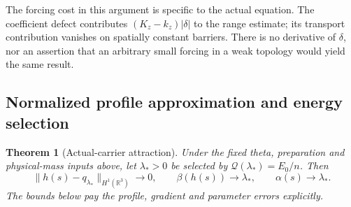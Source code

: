 \documentclass[11pt]{article}
\numberwithin{equation}{section}
\newtheorem{theorem}{Theorem}[section]
\newcommand{\R}{\mathbb R}
\begin{document}
The forcing cost in this argument is specific to the actual equation.
The coefficient defect contributes $(K_z-k_z)|\delta|$ to the range
estimate; its transport contribution vanishes on spatially constant
barriers. There is no derivative of $\delta$, nor an assertion that an
arbitrary small forcing in a weak topology would yield the same result.

\subsection{Normalized profile approximation and energy selection}

\begin{theorem}[Actual-carrier attraction]\label{r15:attraction}
Under the fixed theta, preparation and physical-mass inputs above,
let $\lambda_*>0$ be selected by
$\mathcal Q(\lambda_*)=E_0/n$. Then
\begin{equation}\label{r15:limits}
 \|h(s)-q_{\lambda_*}\|_{H^1(\R^3)}\longrightarrow0,\qquad
 \beta(h(s))\longrightarrow\lambda_*,\qquad
 \alpha(s)\longrightarrow\lambda_*.
\end{equation}
The bounds below pay the profile, gradient and parameter errors explicitly.
\end{theorem}
\end{document}

